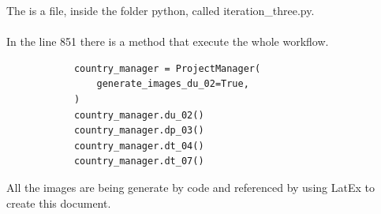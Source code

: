     The is a file, inside the folder python, called iteration\_three.py.
    \\
    \\
    In the line 851 there is a method that execute the whole workflow.

    \begin{verbatim}
            country_manager = ProjectManager(
                generate_images_du_02=True,
            )
            country_manager.du_02()
            country_manager.dp_03()
            country_manager.dt_04()
            country_manager.dt_07()
    \end{verbatim}

    All the images are being generate by code and referenced by using LatEx to create this document.